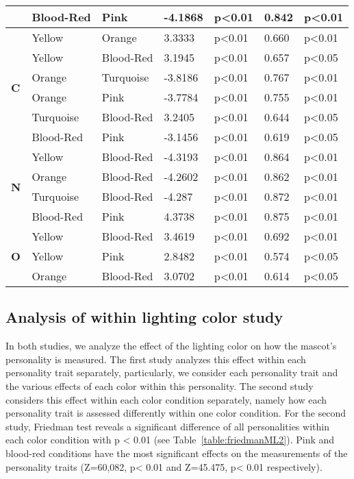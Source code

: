 \begin{longtable} { |p{0.5cm}| p{2cm}|p{2cm}|p{1.5cm}| p{1.7cm}|p{1cm}|p{1.5cm}|  }
&Blood-Red	&Pink		&-4.1868	&p<0.01	&0.842		&p<0.01\\
\hline 
\hline 
\multirow{6}{*}{\textbf{C}} 
&Yellow		&Orange		&3.3333	&p<0.01	&0.660		&p<0.01\\
&Yellow		&Blood-Red	&3.1945	&p<0.01	&0.657 		&p<0.05\\
&Orange		&Turquoise	&-3.8186	&p<0.01	&0.767		&p<0.01\\
&Orange		&Pink		&-3.7784	&p<0.01	&0.755		&p<0.01\\
&Turquoise	&Blood-Red	&3.2405	&p<0.01	&0.644		&p<0.05\\
&Blood-Red	&Pink		&-3.1456	&p<0.01	&0.619		&p<0.05\\
\hline 
\hline 
\multirow{4}{*}{\textbf{N}} 
&Yellow		&Blood-Red	&-4.3193	&p<0.01	&0.864		&p<0.01\\
&Orange		&Blood-Red	&-4.2602	&p<0.01	&0.862		&p<0.01\\
&Turquoise	&Blood-Red	&-4.287	&p<0.01	&0.872		&p<0.01\\
&Blood-Red	&Pink		&4.3738	&p<0.01	&0.875		&p<0.01\\
\hline 
\hline 
\multirow{4}{*}{\textbf{O}} 
&Yellow		&Blood-Red	&3.4619	&p<0.01	&0.692		&p<0.01\\
&Yellow		&Pink		&2.8482	&p<0.01	&0.574		&p<0.05\\
&Orange		&Blood-Red	&3.0702	&p<0.01	&0.614		&p<0.05\\
\hline 
\end{longtable}

\subsection{Analysis of within lighting color study}
\label{Study2(M-L)}
In both studies, we analyze the effect of the lighting color on how the mascot’s personality is measured. The first study analyzes this effect within each personality trait separately, particularly, we consider each personality trait and the various effects of each color within this personality. The second study considers this effect within each color condition separately, namely how each personality trait is assessed differently within one color condition.
For the second study, Friedman test reveals a significant difference of all personalities within each color condition with p < 0.01 (see Table~\ref{table:friedmanML2}). Pink and blood-red conditions have the most significant effects on the measurements of the personality traits 
(Z=60,082, p< 0.01 and Z=45.475, p< 0.01 respectively). 

